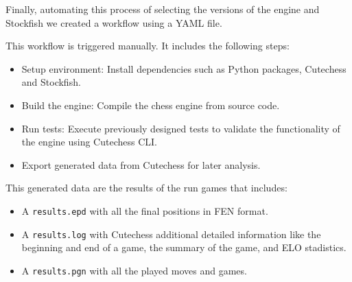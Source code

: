 \vspace{1em}

\noindent Finally, automating this process of selecting the versions of the engine and Stockfish we created a workflow using a YAML file.

\vspace{1em}

\noindent This workflow is triggered manually. It includes the following steps:

\begin{itemize}
    \item Setup environment: Install dependencies such as Python packages, Cutechess and Stockfish.
    \item Build the engine: Compile the chess engine from source code.
    \item Run tests: Execute previously designed tests to validate the functionality of the engine using Cutechess CLI.
    \item Export generated data from Cutechess for later analysis.
\end{itemize}

This generated data are the results of the run games that includes:

\begin{itemize}
    \item A \texttt{results.epd} with all the final positions in FEN format.
    \item A \texttt{results.log} with Cutechess additional detailed information like the beginning and end of a game, the summary of the game, and ELO stadistics.
    \item A \texttt{results.pgn} with all the played moves and games.
\end{itemize}
